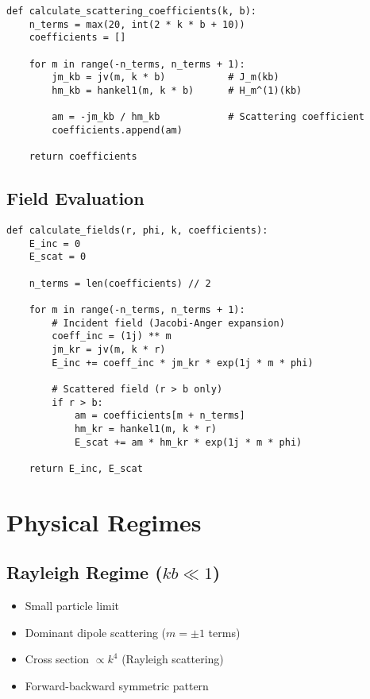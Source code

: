 \documentclass[11pt,a4paper]{article}
\begin{document}
\begin{lstlisting}[caption=Scattering Coefficients]
def calculate_scattering_coefficients(k, b):
    n_terms = max(20, int(2 * k * b + 10))
    coefficients = []
    
    for m in range(-n_terms, n_terms + 1):
        jm_kb = jv(m, k * b)           # J_m(kb)
        hm_kb = hankel1(m, k * b)      # H_m^(1)(kb)
        
        am = -jm_kb / hm_kb            # Scattering coefficient
        coefficients.append(am)
    
    return coefficients
\end{lstlisting}

\subsection{Field Evaluation}

\begin{lstlisting}[caption=Field Calculation]
def calculate_fields(r, phi, k, coefficients):
    E_inc = 0
    E_scat = 0
    
    n_terms = len(coefficients) // 2
    
    for m in range(-n_terms, n_terms + 1):
        # Incident field (Jacobi-Anger expansion)
        coeff_inc = (1j) ** m
        jm_kr = jv(m, k * r)
        E_inc += coeff_inc * jm_kr * exp(1j * m * phi)
        
        # Scattered field (r > b only)
        if r > b:
            am = coefficients[m + n_terms]
            hm_kr = hankel1(m, k * r)
            E_scat += am * hm_kr * exp(1j * m * phi)
    
    return E_inc, E_scat
\end{lstlisting}

\section{Physical Regimes}

\subsection{Rayleigh Regime ($kb \ll 1$)}
\begin{itemize}
\item Small particle limit
\item Dominant dipole scattering ($m = \pm 1$ terms)
\item Cross section $\propto k^4$ (Rayleigh scattering)
\item Forward-backward symmetric pattern
\end{itemize}
\end{document}
